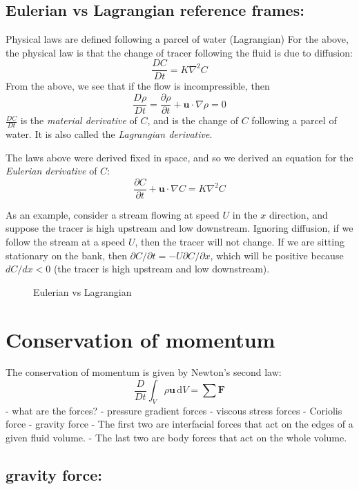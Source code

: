 \subsection{Eulerian vs Lagrangian reference
frames:}\label{eulerian-vs-lagrangian-reference-frames}

Physical laws are defined following a parcel of water (Lagrangian) For
the above, the physical law is that the change of tracer following the
fluid is due to diffusion: \[\frac{D C}{D t} = K\nabla^2 C\] From the
above, we see that if the flow is incompressible, then
\[\frac{D \rho}{D t} = \frac{\partial \rho}{\partial t} + \mathbf{u}\cdot\nabla\rho = 0\]
\(\frac{D C}{D t}\) is the \emph{material derivative} of \(C\), and is
the change of \(C\) following a parcel of water. It is also called the
\emph{Lagrangian derivative}.

The laws above were derived fixed in space, and so we derived an
equation for the \emph{Eulerian derivative} of \(C\):
\[\frac{\partial C}{\partial t} + \mathbf{u}\cdot\nabla C = K\nabla^2 C\]

As an example, consider a stream flowing at speed \(U\) in the \(x\)
direction, and suppose the tracer is high upstream and low downstream.
Ignoring diffusion, if we follow the stream at a speed \(U\), then the
tracer will not change. If we are sitting stationary on the bank, then
\(\partial C/\partial t = -U\partial C/\partial x\), which will be
positive because \(dC/dx < 0\) (the tracer is high upstream and low
downstream).

\begin{figure}
\centering
\pandocbounded{}
\caption{Eulerian vs Lagrangian}
\end{figure}

\section{Conservation of momentum}\label{conservation-of-momentum}

The conservation of momentum is given by Newton's second law:
\[\frac{D}{Dt}\int_V \rho \mathbf{u} \, \mathrm{d}V = \sum \mathbf{F}\]
- what are the forces? - pressure gradient forces - viscous stress
forces - Coriolis force - gravity force - The first two are interfacial
forces that act on the edges of a given fluid volume. - The last two are
body forces that act on the whole volume.

\subsection{gravity force:}\label{gravity-force}

